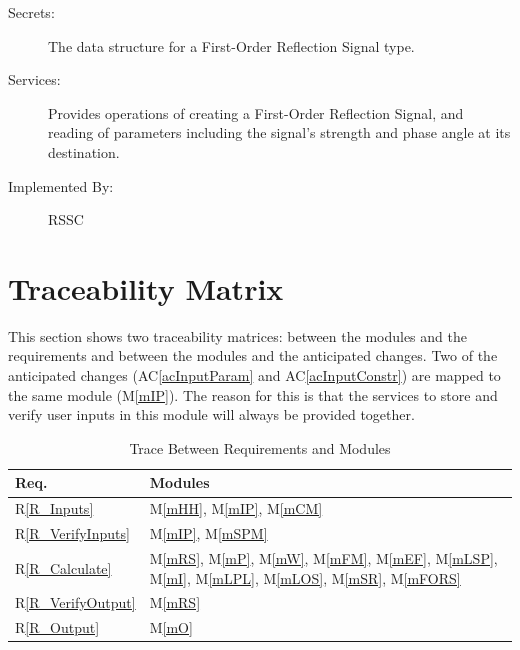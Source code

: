 \documentclass[12pt, titlepage]{article}
\newcommand{\acref}[1]{AC\ref{#1}}
\newcommand{\mref}[1]{M\ref{#1}}
\begin{document}
\begin{description}
\item[Secrets:]The data structure for a First-Order Reflection Signal type.
\item[Services:]Provides operations of creating a First-Order Reflection Signal, and reading of parameters including the signal's strength and phase angle at its destination. 
\item[Implemented By:] RSSC
\end{description}

\section{Traceability Matrix} \label{SecTM}

This section shows two traceability matrices: between the modules and the
requirements and between the modules and the anticipated changes. Two of the anticipated changes (\acref{acInputParam} and \acref{acInputConstr}) are mapped to the same module (\mref{mIP}). The reason for this is that the services to store and verify user inputs in this module will always be provided together.


\begin{table}[H]
\centering
\begin{tabular}{p{} p{}}
\toprule
\textbf{Req.} & \textbf{Modules}\\
\midrule
R\ref{R_Inputs} & \mref{mHH}, \mref{mIP}, \mref{mCM}\\
R\ref{R_VerifyInputs} & \mref{mIP}, \mref{mSPM}\\
R\ref{R_Calculate} & \mref{mRS}, \mref{mP}, \mref{mW}, \mref{mFM}, \mref{mEF}, \mref{mLSP}, \mref{mI}, \mref{mLPL}, \mref{mLOS}, \mref{mSR}, \mref{mFORS}\\
R\ref{R_VerifyOutput} & \mref{mRS}\\
R\ref{R_Output} & \mref{mO}\\
\bottomrule
\end{tabular}
\caption{Trace Between Requirements and Modules}
\label{TblRT}
\end{table}
\end{document}
